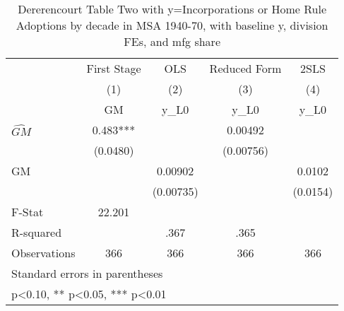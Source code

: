\begin{table}[htbp]\centering
\def\sym#1{\ifmmode^{#1}\else\(^{#1}\)\fi}
\caption{Dererencourt Table Two with y=Incorporations or Home Rule Adoptions by decade in MSA 1940-70, with baseline y, division FEs, and mfg share}
\begin{tabular}{l*{4}{c}}
\toprule
                    & First Stage   &         OLS   &Reduced Form   &        2SLS   \\
                    &\multicolumn{1}{c}{(1)}&\multicolumn{1}{c}{(2)}&\multicolumn{1}{c}{(3)}&\multicolumn{1}{c}{(4)}\\
                    &\multicolumn{1}{c}{GM}&\multicolumn{1}{c}{y\_L0}&\multicolumn{1}{c}{y\_L0}&\multicolumn{1}{c}{y\_L0}\\
\midrule
$\hat{GM}$          &       0.483***&               &     0.00492   &               \\
                    &    (0.0480)   &               &   (0.00756)   &               \\
\addlinespace
GM                  &               &     0.00902   &               &      0.0102   \\
                    &               &   (0.00735)   &               &    (0.0154)   \\
\midrule
F-Stat              &      22.201   &               &               &               \\
R-squared           &               &        .367   &        .365   &               \\
Observations        &         366   &         366   &         366   &         366   \\
\bottomrule
\multicolumn{5}{l}{\footnotesize Standard errors in parentheses}\\
\multicolumn{5}{l}{\footnotesize * p<0.10, ** p<0.05, *** p<0.01}\\
\end{tabular}
\end{table}
